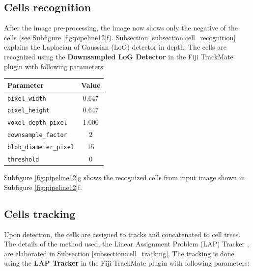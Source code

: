 \documentclass[pdftex,12pt,a4paper]{report}
\begin{document}
\subsection{Cells recognition}

After the image pre-processing, the image now shows only the negative of the cells (see Subfigure \ref{fig:pipeline12}f). Subsection \ref{subsection:cell_recognition} explains the Laplacian of Gaussian (LoG) detector in depth. The cells are recognized using the \textbf{Downsampled LoG Detector} in the Fiji TrackMate plugin \cite{tinevez2017trackmate} with following parameters:

\begin{table}[H]
\centering
\begin{tabular}[t]{ l | c }
\hline
Parameter & Value \\
\hline\hline
\texttt{pixel\_width} & 0.647 \\
\texttt{pixel\_height} & 0.647 \\
\texttt{voxel\_depth\_pixel} & 1.000 \\
\texttt{downsample\_factor} & 2 \\
\texttt{blob\_diameter\_pixel} & 15 \\
\texttt{threshold} & 0 \\
\hline
\end{tabular}
\end{table}

Subfigure \ref{fig:pipeline12}g shows the recognized cells from input image shown in Subfigure \ref{fig:pipeline12}f.

\subsection{Cells tracking}

Upon detection, the cells are assigned to tracks and concatenated to cell trees. The details of the method used, the Linear Assignment Problem (LAP) Tracker \cite{jaqaman2008robust}, are elaborated in Subsection \ref{subsection:cell_tracking}. The tracking is done using the \textbf{LAP Tracker} in the Fiji TrackMate plugin \cite{tinevez2017trackmate} with following parameters:
\end{document}
